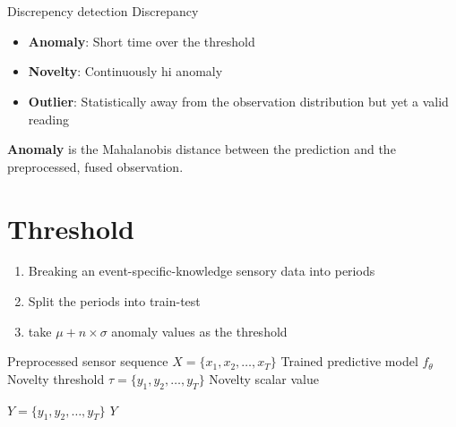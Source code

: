 \section{}
    \begin{frame}[allowframebreaks]{Discrepency detection}
        Discrepancy
        \begin{itemize}
            \item \textbf{Anomaly}: Short time over the threshold
            \item \textbf{Novelty}: Continuously hi anomaly
            \item \textbf{Outlier}: Statistically away from the observation distribution but yet a valid reading
        \end{itemize}
        
        \textbf{Anomaly} is the Mahalanobis distance between the prediction and the preprocessed, fused observation.
        
        
        \section{Threshold}
            \begin{enumerate}
                \item Breaking an event-specific-knowledge sensory data into periods
                \item Split the periods into train-test
                \item take $\mu + n \times \sigma$ anomaly values as the threshold
            \end{enumerate}
            
            \begin{algorithm}[H]
		\caption{Novelty Detection from Sensor Sequences}
        \begin{algorithmic}[1]
			\Require Preprocessed sensor sequence $X = \{x_1, x_2, \dots, x_T\}$
            \Require Trained predictive model $f_{\theta}$
            \Ensure Novelty threshold $\tau = \{y_1, y_2, \dots, y_T\}$
            \Ensure Novelty scalar value
            
            
            $Y = \{y_1, y_2, \dots, y_T\}$
            \State \Return $Y$
        \end{algorithmic}
            \end{algorithm}
    \end{frame}
    
    \subsection{}
        